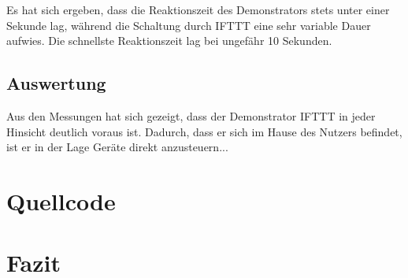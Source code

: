 Es hat sich ergeben, dass die Reaktionszeit des Demonstrators stets unter einer Sekunde lag, während die Schaltung durch IFTTT eine sehr variable Dauer aufwies. Die schnellste Reaktionszeit lag bei ungefähr 10 Sekunden.


\subsection{Auswertung}
Aus den Messungen hat sich gezeigt, dass der Demonstrator IFTTT in jeder Hinsicht deutlich voraus ist. Dadurch, dass er sich im Hause des Nutzers befindet, ist er in der Lage Geräte direkt anzusteuern...

\section{Quellcode}

\section{Fazit}
